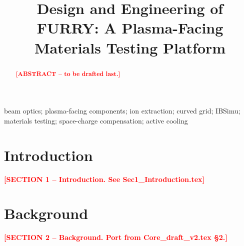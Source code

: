 \documentclass[]{interact}
\newcommand{\INSERT}[1]{\textcolor{red}{\textbf{[#1]}}}
\begin{document}
\title{Design and Engineering of FURRY: A Plasma-Facing Materials Testing
Platform}

\author{
}

\maketitle

\begin{abstract}
\INSERT{ABSTRACT -- to be drafted last.}
\end{abstract}

\begin{keywords}
beam optics; plasma-facing components; ion extraction; curved grid; IBSimu;
materials testing; space-charge compensation; active cooling
\end{keywords}

\newpage

\section{Introduction}
\label{sec:introduction}

\INSERT{SECTION 1 -- Introduction. See Sec1\_Introduction.tex}


\section{Background}
\label{sec:background}

\INSERT{SECTION 2 -- Background. Port from Core\_draft\_v2.tex \S2.}
\end{document}
